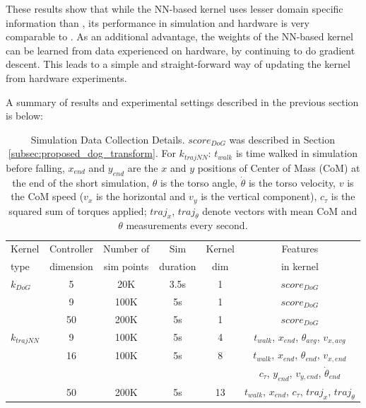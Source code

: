 These results show that while the NN-based kernel uses lesser domain specific information than \dogkernel, its performance in simulation and hardware is very comparable to \dogkernel. As an additional advantage, the weights of the NN-based kernel can be learned from data experienced on hardware, by continuing to do gradient descent. This leads to a simple and straight-forward way of updating the kernel from hardware experiments. 

A summary of results and experimental settings described in the previous section is below:

\begin{table}[h!]
\centering
{}
\small{
\begin{tabular}{ lccccc } 
\toprule
Kernel & Controller & Number of & Sim & Kernel & Features \\
type & dimension & sim points & duration & dim & in kernel \\
\midrule
$k_{DoG}$ & 5 & 20K & 3.5s & 1 & $score_{DoG}$ \\ 
          & 9 & 100K & 5s & 1 & $score_{DoG}$ \\ 
     & 50 & 200K & 5s & 1 & $score_{DoG}$ \\ 
\hline
$k_{\textit{trajNN}}$ & 9 & 100K & 5s & 4 & $t_{walk}$, $x_{end}$, $\theta_{avg}$, $v_{x,avg}$\\ 
                      & 16 & 100K & 5s & 8 &
                $t_{walk}$, $x_{end}$, $\theta_{end}$, $v_{x,end}$\\
                & & & & & $c_{\tau}$,  $y_{end}$,  $v_{y,end}$, $\dot{\theta}_{end}$ \\ 
                      & 50 & 200K & 5s & 13 & $t_{walk}$, $x_{end}$, $c_{\tau}$, $\pmb{\textit{traj}}_{x}$, $\pmb{\textit{traj}}_{\theta}$ \\ 
\bottomrule
\end{tabular}
}
\caption{Simulation Data Collection Details. $score_{DoG}$ was described in Section \ref{subsec:proposed_dog_transform}. For $k_{\textit{trajNN}}$: $t_{walk}$ is time walked in simulation before falling, $x_{end}$ and $y_{end}$ are the $x$ and $y$ positions of Center of Mass (CoM) at the end of the short simulation, $\theta$ is the torso angle, $\dot{\theta}$ is the torso velocity, $v$ is the CoM speed ($v_{x}$ is the horizontal and $v_y$ is the vertical component), $c_{\tau}$ is the squared sum of torques applied; $\pmb{\textit{traj}}_{x}$, $\pmb{\textit{traj}}_{\theta}$ denote vectors with mean CoM and $\theta$ measurements every second.}
\label{tbl:kernel_details}
\end{table}


